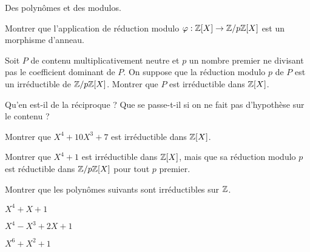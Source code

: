 \documentclass[french]{report}
\begin{document}
\begin{exo}
    Des polynômes et des modulos.
    \begin{q}{1}
        Montrer que l'application de réduction modulo \(\varphi:\mathbb{Z}[X]\to\mathbb{Z}/p\mathbb{Z}[X]\)
        est un morphisme d'anneau.
    \end{q}
    \begin{q}{2}
        Soit \(P\) de contenu multiplicativement neutre et \(p\) un nombre premier ne
        divisant pas le coefficient dominant de \(P\). On suppose que la réduction modulo
        \(p\) de \(P\) est un irréductible de \(\mathbb{Z}/p\mathbb{Z}[X]\). Montrer que \(P\) est irréductible
        dans \(\mathbb{Z}[X]\).
    \end{q}
    \begin{q}{3}
        Qu'en est-il de la réciproque ? Que se passe-t-il si on ne fait pas d'hypothèse
        sur le contenu ?
    \end{q}
    \begin{q}{4}
        Montrer que \(X^4+10X^3+7\) est irréductible dans \(\mathbb{Z}[X]\).
    \end{q}
    \begin{q}{5}
        Montrer que \(X^4+1\) est irréductible dans \(\mathbb{Z}[X]\), mais que sa réduction
        modulo \(p\) est réductible dans \(\mathbb{Z}/p\mathbb{Z}[X]\) pour tout \(p\) premier.
    \end{q}
\end{exo}

\begin{exo}
    Montrer que les polynômes suivants sont irréductibles sur \(\mathbb{Z}\).
    \begin{q}{1}
        \(X^4+X+1\)
    \end{q}
    \begin{q}{2}
        \(X^4-X^3+2X+1\)
    \end{q}
    \begin{q}{3}
        \(X^6+X^2+1\)
    \end{q}
\end{exo}
\end{document}
